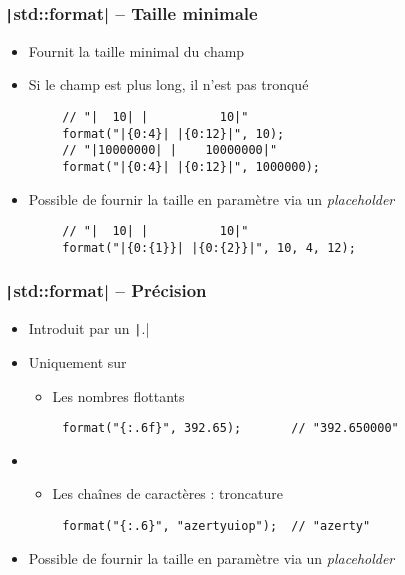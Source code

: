 \documentclass[C++.tex]{subfiles}
\begin{document}
\begin{frame}[fragile]
	\frametitle{\texttt|std::format| -- Taille minimale}
	\begin{itemize}
		\item Fournit la taille minimal du champ
		\item Si le champ est plus long, il n'est pas tronqué
	\end{itemize}

	\begin{verbatim}
		// "|  10| |          10|"
		format("|{0:4}| |{0:12}|", 10);
		// "|10000000| |    10000000|"
		format("|{0:4}| |{0:12}|", 1000000);
	\end{verbatim}

	\begin{itemize}
		\item Possible de fournir la taille en paramètre via un \textit{placeholder}
	\end{itemize}

	\begin{verbatim}
		// "|  10| |          10|"
		format("|{0:{1}}| |{0:{2}}|", 10, 4, 12);
	\end{verbatim}
\end{frame}

\begin{frame}[fragile]
	\frametitle{\texttt|std::format| -- Précision}
	\begin{itemize}
		\item Introduit par un \texttt|.|
		\item Uniquement sur
		\begin{itemize}
			\item Les nombres flottants
		\end{itemize}
	\end{itemize}

	\begin{verbatim}
		format("{:.6f}", 392.65);       // "392.650000"
	\end{verbatim}

	\begin{itemize}
		\item [] \begin{itemize}
			\item Les chaînes de caractères : troncature
		\end{itemize}
	\end{itemize}

	\begin{verbatim}
		format("{:.6}", "azertyuiop");  // "azerty"
	\end{verbatim}

	\begin{itemize}
		\item Possible de fournir la taille en paramètre via un \textit{placeholder}
	\end{itemize}
\end{frame}
\end{document}
